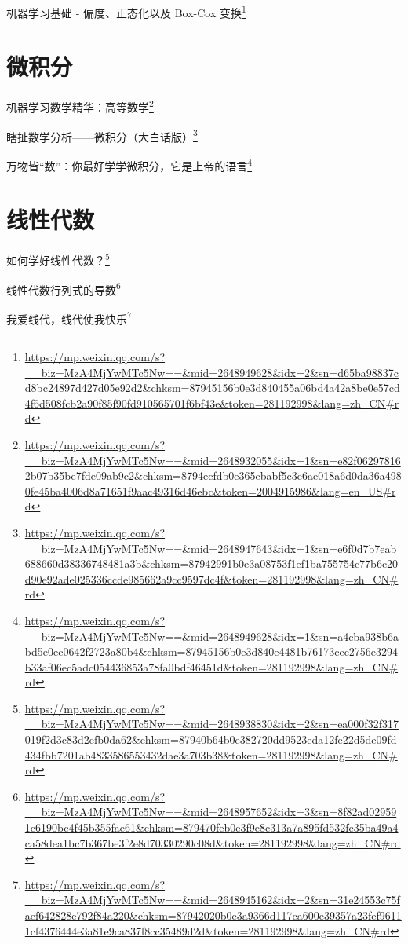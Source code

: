 \documentclass[]{ctexbook}
\renewcommand{\href}[2]{#2\footnote{\url{#1}}}
\begin{document}
\href{https://mp.weixin.qq.com/s?__biz=MzA4MjYwMTc5Nw==\&mid=2648949628\&idx=2\&sn=d65ba98837cd8bc24897d427d05e92d2\&chksm=87945156b0e3d840455a06bd4a42a8be0e57cd4f6d508fcb2a90f85f90fd910565701f6bf43e\&token=281192998\&lang=zh_CN\#rd}{机器学习基础 - 偏度、正态化以及 Box-Cox 变换}

\hypertarget{ux5faeux79efux5206}{%
\section{微积分}\label{ux5faeux79efux5206}}

\href{https://mp.weixin.qq.com/s?__biz=MzA4MjYwMTc5Nw==\&mid=2648932055\&idx=1\&sn=e82f062978162b07b35be7fde09ab9c2\&chksm=8794ecfdb0e365ebabf5c3e6ae018a6d0da36a4980fe45ba4006d8a71651f9aac49316d46ebc\&token=2004915986\&lang=en_US\#rd}{机器学习数学精华：高等数学}

\href{https://mp.weixin.qq.com/s?__biz=MzA4MjYwMTc5Nw==\&mid=2648947643\&idx=1\&sn=e6f0d7b7eab688660d38336748481a3b\&chksm=87942991b0e3a08753f1ef1ba755754c77b6c20d90e92ade025336ccde985662a9cc9597dc4f\&token=281192998\&lang=zh_CN\#rd}{瞎扯数学分析------微积分（大白话版）}

\href{https://mp.weixin.qq.com/s?__biz=MzA4MjYwMTc5Nw==\&mid=2648949628\&idx=1\&sn=a4cba938b6abd5e0ec0642f2723a80b4\&chksm=87945156b0e3d840e4481b76173cec2756e3294b33af06ec5adc054436853a78fa0bdf46451d\&token=281192998\&lang=zh_CN\#rd}{万物皆``数''：你最好学学微积分，它是上帝的语言}

\hypertarget{ux7ebfux6027ux4ee3ux6570}{%
\section{线性代数}\label{ux7ebfux6027ux4ee3ux6570}}

\href{https://mp.weixin.qq.com/s?__biz=MzA4MjYwMTc5Nw==\&mid=2648938830\&idx=2\&sn=ea000f32f317019f2d3c83d2efb0da62\&chksm=87940b64b0e382720dd9523eda12fe22d5de09fd434fbb7201ab4833586553432dae3a703b38\&token=281192998\&lang=zh_CN\#rd}{如何学好线性代数？}

\href{https://mp.weixin.qq.com/s?__biz=MzA4MjYwMTc5Nw==\&mid=2648957652\&idx=3\&sn=8f82ad029591c6190bc4f45b355fae61\&chksm=879470feb0e3f9e8c313a7a895fd532fc35ba49a4ca58dea1bc7b367be3f2e8d70330290c08d\&token=281192998\&lang=zh_CN\#rd}{线性代数行列式的导数}

\href{https://mp.weixin.qq.com/s?__biz=MzA4MjYwMTc5Nw==\&mid=2648945162\&idx=2\&sn=31e24553c75faef642828e792f84a220\&chksm=87942020b0e3a9366d117ca600e39357a23fef96111cf4376444e3a81e9ca837f8cc35489d2d\&token=281192998\&lang=zh_CN\#rd}{我爱线代，线代使我快乐}
\end{document}
